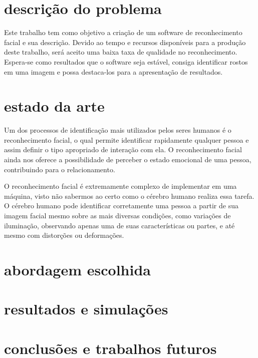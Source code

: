 
\section*{descrição do problema}

Este trabalho tem como objetivo a criação de um software de reconhecimento facial e sua descrição. Devido ao tempo e recursos disponíveis para a produção deste trabalho, será aceito uma baixa taxa de qualidade no reconhecimento. Espera-se como resultados que o software seja estável, consiga identificar rostos em uma imagem e possa destaca-los para a apresentação de resultados.

\section*{estado da arte}

Um dos processos de identificação mais utilizados pelos seres humanos é o reconhecimento facial, o qual permite identificar rapidamente qualquer pessoa e assim definir o tipo apropriado de interação com ela. O reconhecimento facial ainda nos oferece a possibilidade de perceber o estado emocional de uma pessoa, contribuindo para o relacionamento.

O reconhecimento facial é extremamente complexo de implementar em uma máquina, visto não sabermos ao certo como o cérebro humano realiza essa tarefa. O cérebro humano pode identificar corretamente uma pessoa a partir de sua imagem facial mesmo sobre as mais diversas condições, como variações de iluminação, observando apenas uma de suas características ou partes, e até mesmo com distorções ou deformações.

\section*{abordagem escolhida}

\lipsum[3]

\section*{resultados e simulações}

\lipsum[4]

\section*{conclusões e trabalhos futuros}

\lipsum[5]